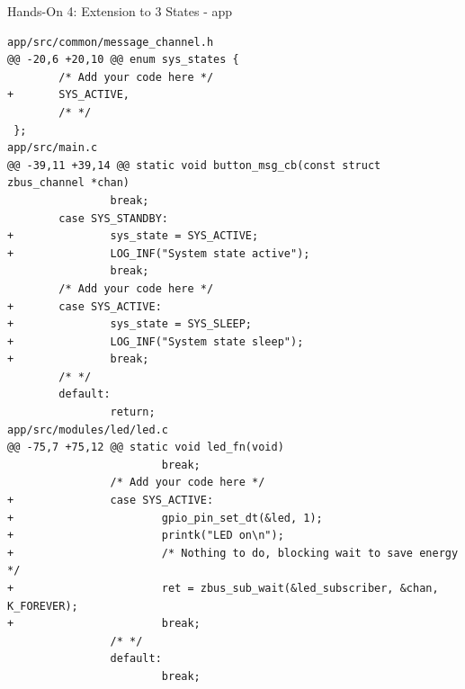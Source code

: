 \documentclass[10pt, aspectratio=169]{beamer}
\begin{document}
\begin{frame}[fragile]{Hands-On 4: Extension to 3 States - app}
  \begin{verbatim}
app/src/common/message_channel.h
@@ -20,6 +20,10 @@ enum sys_states {
        /* Add your code here */
+       SYS_ACTIVE,
        /* */
 };
app/src/main.c
@@ -39,11 +39,14 @@ static void button_msg_cb(const struct zbus_channel *chan)
                break;
        case SYS_STANDBY:
+               sys_state = SYS_ACTIVE;
+               LOG_INF("System state active");
                break;
        /* Add your code here */
+       case SYS_ACTIVE:
+               sys_state = SYS_SLEEP;
+               LOG_INF("System state sleep");
+               break;
        /* */
        default:
                return;
app/src/modules/led/led.c
@@ -75,7 +75,12 @@ static void led_fn(void)
                        break;
                /* Add your code here */
+               case SYS_ACTIVE:
+                       gpio_pin_set_dt(&led, 1);
+                       printk("LED on\n");
+                       /* Nothing to do, blocking wait to save energy */
+                       ret = zbus_sub_wait(&led_subscriber, &chan, K_FOREVER);
+                       break;
                /* */
                default:
                        break;
  \end{verbatim}
\end{frame}
\end{document}
